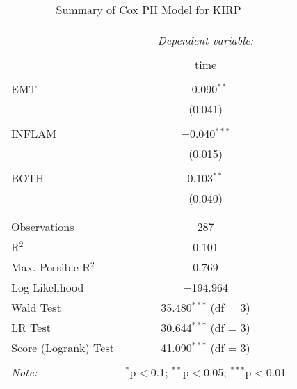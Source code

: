
\begin{table}[!htbp] \centering 
  \caption{Summary of Cox PH Model for KIRP} 
  \label{table:KIRP_cph} 
\begin{tabular}{@{\extracolsep{5pt}}lc} 
\\[-1.8ex]\hline 
\hline \\[-1.8ex] 
 & \multicolumn{1}{c}{\textit{Dependent variable:}} \\ 
\cline{2-2} 
\\[-1.8ex] & time \\ 
\hline \\[-1.8ex] 
 EMT & $-$0.090$^{**}$ \\ 
  & (0.041) \\ 
  & \\ 
 INFLAM & $-$0.040$^{***}$ \\ 
  & (0.015) \\ 
  & \\ 
 BOTH & 0.103$^{**}$ \\ 
  & (0.040) \\ 
  & \\ 
\hline \\[-1.8ex] 
Observations & 287 \\ 
R$^{2}$ & 0.101 \\ 
Max. Possible R$^{2}$ & 0.769 \\ 
Log Likelihood & $-$194.964 \\ 
Wald Test & 35.480$^{***}$ (df = 3) \\ 
LR Test & 30.644$^{***}$ (df = 3) \\ 
Score (Logrank) Test & 41.090$^{***}$ (df = 3) \\ 
\hline 
\hline \\[-1.8ex] 
\textit{Note:}  & \multicolumn{1}{r}{$^{*}$p$<$0.1; $^{**}$p$<$0.05; $^{***}$p$<$0.01} \\ 
\end{tabular} 
\end{table} 
